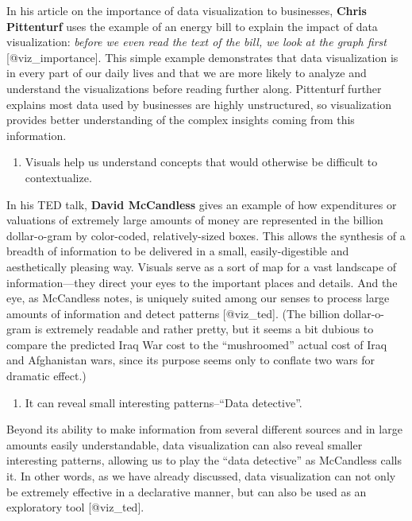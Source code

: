 \documentclass[]{book}
\providecommand{\tightlist}{%
  \setlength{\itemsep}{0pt}\setlength{\parskip}{0pt}}
\theoremstyle{definition}
\theoremstyle{definition}
\theoremstyle{definition}
\theoremstyle{remark}
\begin{document}
In his article on the importance of data visualization to businesses,
\textbf{Chris Pittenturf} uses the example of an energy bill to explain
the impact of data visualization: \emph{before we even read the text of
the bill, we look at the graph first} {[}@viz\_importance{]}. This
simple example demonstrates that data visualization is in every part of
our daily lives and that we are more likely to analyze and understand
the visualizations before reading further along. Pittenturf further
explains most data used by businesses are highly unstructured, so
visualization provides better understanding of the complex insights
coming from this information.

\begin{enumerate}
\def\labelenumi{\arabic{enumi}.}
\setcounter{enumi}{1}
\tightlist
\item
  Visuals help us understand concepts that would otherwise be difficult
  to contextualize.
\end{enumerate}

In his TED talk, \textbf{David McCandless} gives an example of how
expenditures or valuations of extremely large amounts of money are
represented in the billion dollar-o-gram by color-coded,
relatively-sized boxes. This allows the synthesis of a breadth of
information to be delivered in a small, easily-digestible and
aesthetically pleasing way. Visuals serve as a sort of map for a vast
landscape of information---they direct your eyes to the important places
and details. And the eye, as McCandless notes, is uniquely suited among
our senses to process large amounts of information and detect patterns
{[}@viz\_ted{]}. (The billion dollar-o-gram is extremely readable and
rather pretty, but it seems a bit dubious to compare the predicted Iraq
War cost to the ``mushroomed'' actual cost of Iraq and Afghanistan wars,
since its purpose seems only to conflate two wars for dramatic effect.)

\begin{enumerate}
\def\labelenumi{\arabic{enumi}.}
\setcounter{enumi}{2}
\tightlist
\item
  It can reveal small interesting patterns--``Data detective''.
\end{enumerate}

Beyond its ability to make information from several different sources
and in large amounts easily understandable, data visualization can also
reveal smaller interesting patterns, allowing us to play the ``data
detective'' as McCandless calls it. In other words, as we have already
discussed, data visualization can not only be extremely effective in a
declarative manner, but can also be used as an exploratory tool
{[}@viz\_ted{]}.
\end{document}
